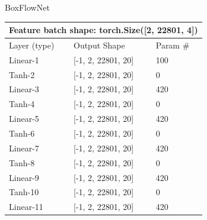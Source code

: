 \documentclass{article}
\begin{document}
\centerline{BoxFlowNet}
\begin{table}[H]
	\centering
	\begin{tabular}{lll}
		\hline
		\multicolumn{3}{|c|}{Feature batch shape:
		torch.Size({[}2, 22801, 4{]})}
		\\ \hline
		\multicolumn{1}{|l|}{Layer (type)}           &
		\multicolumn{1}{l|}{Output Shape}            &
		\multicolumn{1}{l|}{Param \#}                  \\
		\hline
		\multicolumn{1}{|l|}{Linear-1}               &
		\multicolumn{1}{l|}{{[}-1, 2, 22801, 20{]}}  &
		\multicolumn{1}{l|}{100}                       \\
		\hline
		\multicolumn{1}{|l|}{Tanh-2}                 &
		\multicolumn{1}{l|}{{[}-1, 2, 22801, 20{]}}  &
		\multicolumn{1}{l|}{0}                         \\
		\hline
		\multicolumn{1}{|l|}{Linear-3}               &
		\multicolumn{1}{l|}{{[}-1, 2, 22801, 20{]}}  &
		\multicolumn{1}{l|}{420}                       \\
		\hline
		\multicolumn{1}{|l|}{Tanh-4}                 &
		\multicolumn{1}{l|}{{[}-1, 2, 22801, 20{]}}  &
		\multicolumn{1}{l|}{0}                         \\
		\hline
		\multicolumn{1}{|l|}{Linear-5}               &
		\multicolumn{1}{l|}{{[}-1, 2, 22801, 20{]}}  &
		\multicolumn{1}{l|}{420}                       \\
		\hline
		\multicolumn{1}{|l|}{Tanh-6}                 &
		\multicolumn{1}{l|}{{[}-1, 2, 22801, 20{]}}  &
		\multicolumn{1}{l|}{0}                         \\
		\hline
		\multicolumn{1}{|l|}{Linear-7}               &
		\multicolumn{1}{l|}{{[}-1, 2, 22801, 20{]}}  &
		\multicolumn{1}{l|}{420}                       \\
		\hline
		\multicolumn{1}{|l|}{Tanh-8}                 &
		\multicolumn{1}{l|}{{[}-1, 2, 22801, 20{]}}  &
		\multicolumn{1}{l|}{0}                         \\
		\hline
		\multicolumn{1}{|l|}{Linear-9}               &
		\multicolumn{1}{l|}{{[}-1, 2, 22801, 20{]}}  &
		\multicolumn{1}{l|}{420}                       \\
		\hline
		\multicolumn{1}{|l|}{Tanh-10}                &
		\multicolumn{1}{l|}{{[}-1, 2, 22801, 20{]}}  &
		\multicolumn{1}{l|}{0}                         \\
		\hline
		\multicolumn{1}{|l|}{Linear-11}              &
		\multicolumn{1}{l|}{{[}-1, 2, 22801, 20{]}}  &
		\multicolumn{1}{l|}{420}                       \\

\end{tabular}
\end{table}
\end{document}

